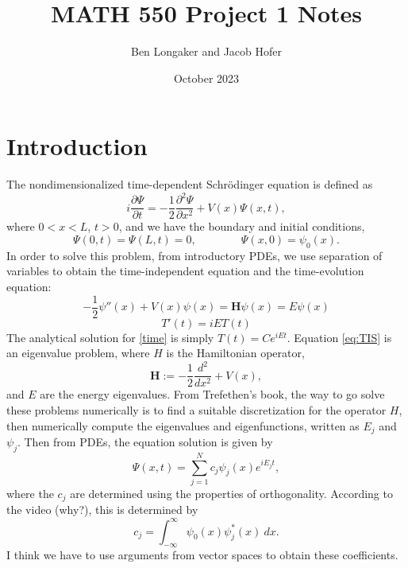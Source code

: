 \documentclass{article}
\title{MATH 550 Project 1 Notes}
\author{Ben Longaker and Jacob Hofer}
\date{October 2023}
\begin{document}
\maketitle

\section{Introduction}

The nondimensionalized time-dependent Schr\"{o}dinger equation is defined as
$$i\frac{\partial\Psi}{\partial t} = -\frac{1}{2} \frac{\partial^2 \Psi}{\partial x^2} + V(x)\Psi(x,t),$$
where $0<x<L$, $t>0$, and we have the boundary and initial conditions,
$$\Psi(0,t) = \Psi(L,t) = 0, \qquad \qquad \Psi(x,0) = \psi_0(x).$$
In order to solve this problem, from introductory PDEs, we use separation of variables to obtain the time-independent equation and the time-evolution equation:
\begin{equation}
    -\frac{1}{2}\psi''(x) + V(x)\psi(x) = \mathbf{H}\psi(x) = E\psi(x) \label{eq:TIS}
\end{equation}
\begin{equation}
    T'(t) = iET(t) \label{time}
\end{equation}
The analytical solution for \eqref{time} is simply $T(t) = Ce^{iEt}$. Equation \eqref{eq:TIS} is an eigenvalue problem, where $H$ is the Hamiltonian operator,
\begin{equation}
    \mathbf{H} := -\frac{1}{2}\frac{d^2}{dx^2} + V(x), \label{eq:H}
\end{equation}
and $E$ are the energy eigenvalues. From Trefethen's book, the way to go solve these problems numerically is to find a suitable discretization for the operator $H$, then numerically compute the eigenvalues and eigenfunctions, written as $E_j$ and $\psi_j$. Then from PDEs, the equation solution is given by
\begin{equation}
    \Psi(x,t) = \sum_{j=1}^N c_j \psi_j(x) e^{iE_jt}, \label{soln}
\end{equation}
where the $c_j$ are determined using the properties of orthogonality. According to the video (why?), this is determined by
\begin{equation}
    c_j = \int_{-\infty}^{\infty} \psi_0(x)\psi_j^*(x) \ dx. \label{coefficients}
\end{equation}
I think we have to use arguments from vector spaces to obtain these coefficients.
\end{document}
